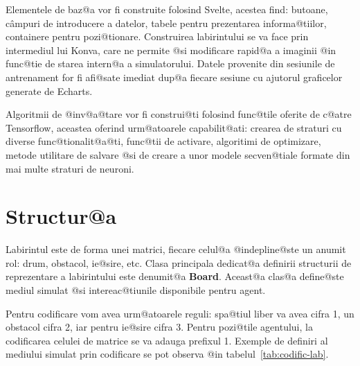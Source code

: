 Elementele de baz@a vor fi construite folosind Svelte, acestea find: butoane, c\^ ampuri de introducere a datelor, tabele pentru prezentarea informa@tiilor, containere pentru pozi@tionare. Construirea labirintului se va face prin intermediul lui Konva, care ne permite @si modificare rapid@a a imaginii @in func@tie de starea intern@a a simulatorului. Datele provenite din sesiunile de antrenament for fi afi@sate imediat dup@a fiecare sesiune cu ajutorul graficelor generate de Echarts.

Algoritmii de @inv@a@tare vor fi construi@ti folosind func@tile oferite de c@atre Tensorflow, aceastea oferind urm@atoarele capabilit@ati: crearea de straturi cu diverse func@tionalit@a@ti, func@tii de activare, algoritimi de optimizare, metode utilitare de salvare @si de creare a unor modele secven@tiale formate din mai multe straturi de neuroni.

\section{Structur@a}


Labirintul este de forma unei matrici, fiecare celul@a @indepline@ste un anumit rol: drum, obstacol, ie@sire, etc. Clasa principala dedicat@a definirii structurii de reprezentare a la\-bi\-rin\-tului este denumit@a \textbf{Board}. Aceast@a clas@a define@ste mediul simulat @si intereac@tiunile disponibile pentru agent.

Pentru codificare vom avea urm@atoarele reguli: spa@tiul liber va avea cifra 1, un obstacol cifra 2, iar pentru ie@sire cifra 3. Pentru pozi@tile agentului, la codificarea celulei de matrice se va adauga prefixul 1. Exemple de definiri al mediului simulat prin codificare se pot observa @in tabelul~\ref{tab:codific-lab}.


